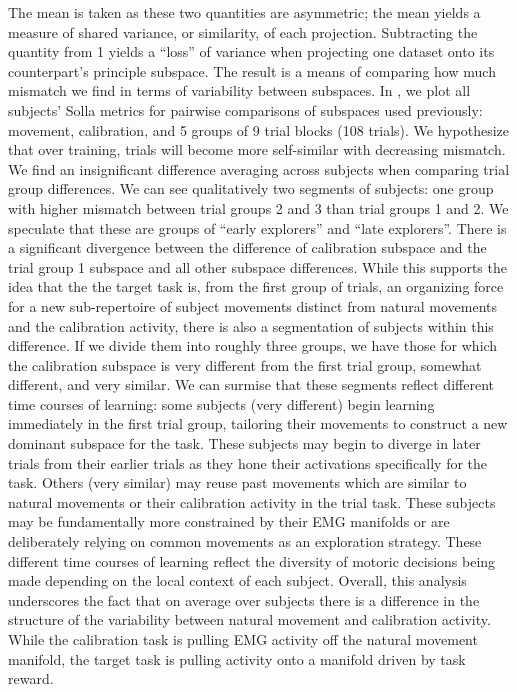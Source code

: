 \documentclass[../main.tex]{subfiles}
\begin{document}
The mean is taken as these two quantities are asymmetric; the mean yields a measure of shared variance, or similarity, of each projection. Subtracting the quantity from 1 yields a ``loss'' of variance when projecting one dataset onto its counterpart's principle subspace. The result is a means of comparing how much mismatch we find in terms of variability between subspaces. In , we plot all subjects' Solla metrics for pairwise comparisons of subspaces used previously: movement, calibration, and 5 groups of 9 trial blocks (108 trials). We hypothesize that over training, trials will become more self-similar with decreasing mismatch. We find an insignificant difference averaging across subjects when comparing trial group differences. We can see qualitatively two segments of subjects: one group with higher mismatch between trial groups 2 and 3 than trial groups 1 and 2. We speculate that these are groups of ``early explorers'' and ``late explorers''. There is a significant divergence between the difference of calibration subspace and the trial group 1 subspace and all other subspace differences. While this supports the idea that the the target task is, from the first group of trials, an organizing force for a new sub-repertoire of subject movements distinct from natural movements and the calibration activity, there is also a segmentation of subjects within this difference. If we divide them into roughly three groups, we have those for which the calibration subspace is very different from the first trial group, somewhat different, and very similar. We can surmise that these segments reflect different time courses of learning: some subjects (very different) begin learning immediately in the first trial group, tailoring their movements to construct a new dominant subspace for the task. These subjects may begin to diverge in later trials from their earlier trials as they hone their activations specifically for the task. Others (very similar) may reuse past movements which are similar to natural movements or their calibration activity in the trial task. These subjects may be fundamentally more constrained by their EMG manifolds or are deliberately relying on common movements as an exploration strategy. These different time courses of learning reflect the diversity of motoric decisions being made depending on the local context of each subject. Overall, this analysis underscores the fact that on average over subjects there is a difference in the structure of the variability between natural movement and calibration activity. While the calibration task is pulling EMG activity off the natural movement manifold, the target task is pulling activity onto a manifold driven by task reward.
\end{document}
